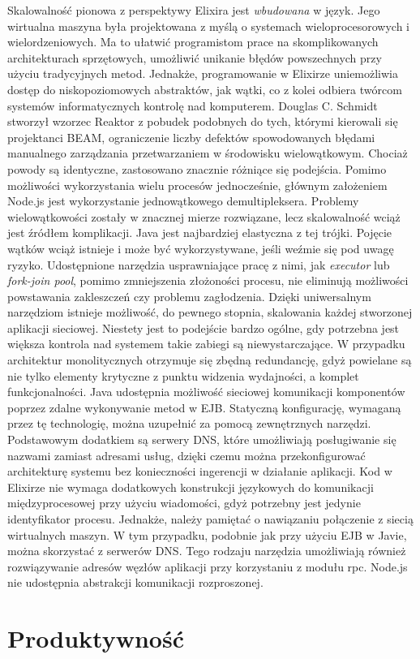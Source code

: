 \documentclass[12pt,twoside]{article}
\begin{document}
Skalowalność pionowa z perspektywy Elixira jest \emph{wbudowana} w
język. Jego wirtualna maszyna była projektowana z myślą o systemach
wieloprocesorowych i wielordzeniowych. Ma to ułatwić programistom prace
na skomplikowanych architekturach sprzętowych, umożliwić unikanie błędów
powszechnych przy użyciu tradycyjnych metod. Jednakże, programowanie w
Elixirze uniemożliwia dostęp do niskopoziomowych abstraktów, jak wątki,
co z kolei odbiera twórcom systemów informatycznych kontrolę nad
komputerem. Douglas C. Schmidt stworzył wzorzec Reaktor z pobudek
podobnych do tych, którymi kierowali się projektanci BEAM, ograniczenie
liczby defektów spowodowanych błędami manualnego zarządzania
przetwarzaniem w środowisku wielowątkowym. Chociaż powody są identyczne,
zastosowano znacznie różniące się podejścia. Pomimo możliwości
wykorzystania wielu procesów jednocześnie, głównym założeniem Node.js
jest wykorzystanie jednowątkowego demultipleksera. Problemy
wielowątkowości zostały w znacznej mierze rozwiązane, lecz skalowalność
wciąż jest źródłem komplikacji. Java jest najbardziej elastyczna z tej
trójki. Pojęcie wątków wciąż istnieje i może być wykorzystywane, jeśli
weźmie się pod uwagę ryzyko. Udostępnione narzędzia usprawniające pracę
z nimi, jak \emph{executor} lub \emph{fork-join pool}, pomimo
zmniejszenia złożoności procesu, nie eliminują możliwości powstawania
zakleszczeń czy problemu zagłodzenia. Dzięki uniwersalnym narzędziom
istnieje możliwość, do pewnego stopnia, skalowania każdej stworzonej
aplikacji sieciowej. Niestety jest to podejście bardzo ogólne, gdy
potrzebna jest większa kontrola nad systemem takie zabiegi są
niewystarczające. W przypadku architektur monolitycznych otrzymuje się
zbędną redundancję, gdyż powielane są nie tylko elementy krytyczne z
punktu widzenia wydajności, a komplet funkcjonalności. Java udostępnia
możliwość sieciowej komunikacji komponentów poprzez zdalne wykonywanie
metod w EJB. Statyczną konfigurację, wymaganą przez tę technologię,
można uzupełnić za pomocą zewnętrznych narzędzi. Podstawowym dodatkiem
są serwery DNS, które umożliwiają posługiwanie się nazwami zamiast
adresami usług, dzięki czemu można przekonfigurować architekturę systemu
bez konieczności ingerencji w działanie aplikacji. Kod w Elixirze nie
wymaga dodatkowych konstrukcji językowych do komunikacji
międzyprocesowej przy użyciu wiadomości, gdyż potrzebny jest jedynie
identyfikator procesu. Jednakże, należy pamiętać o nawiązaniu połączenie
z siecią wirtualnych maszyn. W tym przypadku, podobnie jak przy użyciu
EJB w Javie, można skorzystać z serwerów DNS. Tego rodzaju narzędzia
umożliwiają również rozwiązywanie adresów węzłów aplikacji przy
korzystaniu z modułu rpc. Node.js nie udostępnia abstrakcji komunikacji
rozproszonej.
\clearpage{}
	\clearpage{}\section{Produktywność}\label{produktywnoux15bux107}
\end{document}
